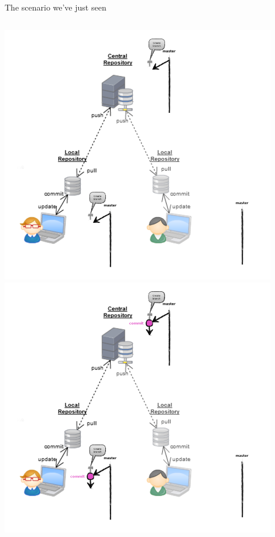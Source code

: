\begin{frame}[fragile]{The scenario we've just seen}
\begin{columns}
\begin{column}{0.4\textwidth}
\begin{center}
{			}\only<2> {
				\includegraphics[width=0.9\textwidth]{multiuser_remote_branch}
			}\only<3> {
				\includegraphics[width=0.9\textwidth]{multiuser_push_branch}
			}\only<4> {
}
\end{center}
\end{column}
\end{columns}
\end{frame}
